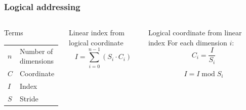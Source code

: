 \documentclass{beamer}
\makeatletter
\newenvironment{conditions}
  {\par\vspace{\abovedisplayskip}\noindent\begin{tabular}{>{$}l<{$} @{${}={}$} l}}
  {\end{tabular}\par\vspace{\belowdisplayskip}}
\makeatother
\begin{document}
\begin{frame}
  \frametitle{Logical addressing}
  \begin{columns}[c]
    \begin{block}{Terms}
    \begin{conditions}
      n & Number of dimensions \\
      C & Coordinate \\
      I & Index \\
      S & Stride \\
    \end{conditions}
    \end{block}
    \begin{block}{Linear index from logical coordinate}
    \begin{equation*}
      I = \sum\limits_{i=0}^{n-1} (S_i \cdot C_i)
    \end{equation*}
    \end{block}
    \begin{block}{Logical coordinate from linear index}
      For each dimension $i$:
      \begin{equation*}
        C_i = \frac{I}{S_i}
      \end{equation*}

      \begin{equation*}
        I = I \operatorname{mod} S_i
      \end{equation*}
    \end{block}
  \end{columns}
\end{frame}
\end{document}
